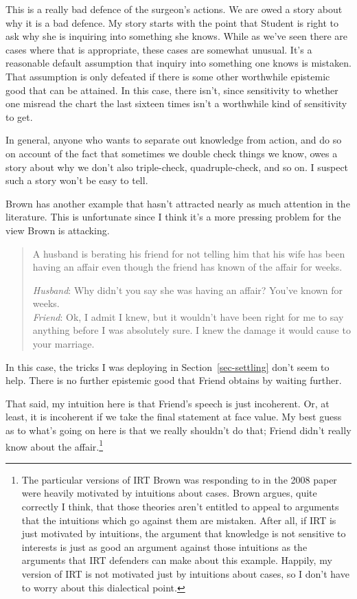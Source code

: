 \documentclass[
  10pt,
  letterpaper,
  twoside]{scrbook}
\begin{document}
This is a really bad defence of the surgeon's actions. We are owed a
story about why it is a bad defence. My story starts with the point that
Student is right to ask why she is inquiring into something she knows.
While as we've seen there are cases where that is appropriate, these
cases are somewhat unusual. It's a reasonable default assumption that
inquiry into something one knows is mistaken. That assumption is only
defeated if there is some other worthwhile epistemic good that can be
attained. In this case, there isn't, since sensitivity to whether one
misread the chart the last sixteen times isn't a worthwhile kind of
sensitivity to get.

In general, anyone who wants to separate out knowledge from action, and
do so on account of the fact that sometimes we double check things we
know, owes a story about why we don't also triple-check,
quadruple-check, and so on. I suspect such a story won't be easy to
tell.

Brown has another example that hasn't attracted nearly as much attention
in the literature. This is unfortunate since I think it's a more
pressing problem for the view Brown is attacking.

\begin{quote}
A husband is berating his friend for not telling him that his wife has
been having an affair even though the friend has known of the affair for
weeks.

\emph{Husband}: Why didn't you say she was having an affair? You've
known for weeks.\\
\emph{Friend}: Ok, I admit I knew, but it wouldn't have been right for
me to say anything before I was absolutely sure. I knew the damage it
would cause to your marriage.
\end{quote}

In this case, the tricks I was deploying in Section~\ref{sec-settling}
don't seem to help. There is no further epistemic good that Friend
obtains by waiting further.

That said, my intuition here is that Friend's speech is just incoherent.
Or, at least, it is incoherent if we take the final statement at face
value. My best guess as to what's going on here is that we really
shouldn't do that; Friend didn't really know about the
affair.\footnote{The particular versions of IRT Brown was responding to
  in the 2008 paper were heavily motivated by intuitions about cases.
  Brown argues, quite correctly I think, that those theories aren't
  entitled to appeal to arguments that the intuitions which go against
  them are mistaken. After all, if IRT is just motivated by intuitions,
  the argument that knowledge is not sensitive to interests is just as
  good an argument against those intuitions as the arguments that IRT
  defenders can make about this example. Happily, my version of IRT is
  not motivated just by intuitions about cases, so I don't have to worry
  about this dialectical point.}
\end{document}
